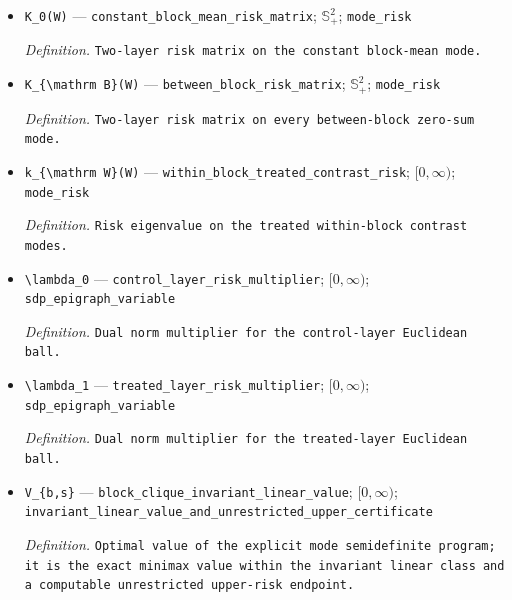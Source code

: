 \documentclass{article}
\begin{document}
\begin{itemize}
  \item \texttt{K\_\allowbreak{}0(W)} --- \texttt{constant\_\allowbreak{}block\_\allowbreak{}mean\_\allowbreak{}risk\_\allowbreak{}matrix}; \(\mathbb S_+^2\); \texttt{mode\_\allowbreak{}risk}
  \par\smallskip\noindent\emph{Definition.} \texttt{Two-\allowbreak{}layer risk matrix on the constant block-\allowbreak{}mean mode.}
  \item \texttt{K\_\allowbreak{}\{\textbackslash{}\allowbreak{}mathrm B\}\allowbreak{}(W)} --- \texttt{between\_\allowbreak{}block\_\allowbreak{}risk\_\allowbreak{}matrix}; \(\mathbb S_+^2\); \texttt{mode\_\allowbreak{}risk}
  \par\smallskip\noindent\emph{Definition.} \texttt{Two-\allowbreak{}layer risk matrix on every between-\allowbreak{}block zero-\allowbreak{}sum mode.}
  \item \texttt{k\_\allowbreak{}\{\textbackslash{}\allowbreak{}mathrm W\}\allowbreak{}(W)} --- \texttt{within\_\allowbreak{}block\_\allowbreak{}treated\_\allowbreak{}contrast\_\allowbreak{}risk}; \([0,\infty)\); \texttt{mode\_\allowbreak{}risk}
  \par\smallskip\noindent\emph{Definition.} \texttt{Risk eigenvalue on the treated within-\allowbreak{}block contrast modes.}
  \item \texttt{\textbackslash{}\allowbreak{}lambda\_\allowbreak{}0} --- \texttt{control\_\allowbreak{}layer\_\allowbreak{}risk\_\allowbreak{}multiplier}; \([0,\infty)\); \texttt{sdp\_\allowbreak{}epigraph\_\allowbreak{}variable}
  \par\smallskip\noindent\emph{Definition.} \texttt{Dual norm multiplier for the control-\allowbreak{}layer Euclidean ball.}
  \item \texttt{\textbackslash{}\allowbreak{}lambda\_\allowbreak{}1} --- \texttt{treated\_\allowbreak{}layer\_\allowbreak{}risk\_\allowbreak{}multiplier}; \([0,\infty)\); \texttt{sdp\_\allowbreak{}epigraph\_\allowbreak{}variable}
  \par\smallskip\noindent\emph{Definition.} \texttt{Dual norm multiplier for the treated-\allowbreak{}layer Euclidean ball.}
  \item \texttt{V\_\allowbreak{}\{b,\allowbreak{}s\}\allowbreak{}} --- \texttt{block\_\allowbreak{}clique\_\allowbreak{}invariant\_\allowbreak{}linear\_\allowbreak{}value}; \([0,\infty)\); \texttt{invariant\_\allowbreak{}linear\_\allowbreak{}value\_\allowbreak{}and\_\allowbreak{}unrestricted\_\allowbreak{}upper\_\allowbreak{}certificate}
  \par\smallskip\noindent\emph{Definition.} \texttt{Optimal value of the explicit mode semidefinite program;\allowbreak{} it is the exact minimax value within the invariant linear class and a computable unrestricted upper-\allowbreak{}risk endpoint.}

\end{itemize}
\end{document}
